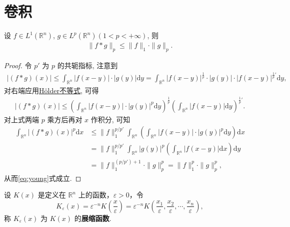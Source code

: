 \documentclass[../../main.tex]{subfiles}%
\begin{document}
\section{卷积}

\begin{theorem}[Young不等式]\label{theorem:实变函数--Young不等式}
设 $f\in L^1(\mathbb{R}^n)$, $g\in L^p(\mathbb{R}^n)(1<p<+\infty)$, 则
\begin{align}
\|f*g\|_p \leqslant \|f\|_1 \cdot \|g\|_p.
\label{eq:young}
\end{align}
\end{theorem}
\begin{proof}
令 $p'$ 为 $p$ 的共轭指标, 注意到
\begin{align*}
|(f*g)(x)| \leqslant \int_{\mathbb{R}^n} |f(x-y)| \cdot |g(y)| \mathrm{d}y 
= \int_{\mathbb{R}^n} |f(x-y)|^{\frac{1}{p}} \cdot |g(y)| \cdot |f(x-y)|^{\frac{1}{p}'} \mathrm{d}y,
\end{align*}
对右端应用\hyperref[theorem:实变函数--Hölder不等式]{Hölder不等式}, 可得
\begin{align*}
|(f*g)(x)| \leqslant \left( \int_{\mathbb{R}^n} |f(x-y)| \cdot |g(y)|^p \mathrm{d}y \right)^{\frac{1}{p}} \left( \int_{\mathbb{R}^n} |f(x-y)| \mathrm{d}y \right)^{\frac{1}{p}'}.
\end{align*}
对上式两端 $p$ 乘方后再对 $x$ 作积分, 可知
\begin{align*}
\int_{\mathbb{R}^n} |(f*g)(x)|^p \mathrm{d}x
&\leqslant \|f\|_1^{p/p'} \int_{\mathbb{R}^n} \left( \int_{\mathbb{R}^n} |f(x-y)| \cdot |g(y)|^p \mathrm{d}y \right) \mathrm{d}x \\
&= \|f\|_1^{p/p'} \int_{\mathbb{R}^n} |g(y)|^p \left( \int_{\mathbb{R}^n} |f(x-y)| \mathrm{d}x \right) \mathrm{d}y \\
&= \|f\|_1^{(p/p')+1} \cdot \|g\|_p^p = \|f\|_1^p \cdot \|g\|_p^p,
\end{align*}
从而\eqref{eq:young}式成立.
\end{proof}

\begin{definition}[展缩函数]\label{definition:展缩函数}
设 \( K(x) \) 是定义在 \( \mathbb{R}^n \) 上的函数，\( \varepsilon > 0 \)，令
\[
K_{\varepsilon}(x) = \varepsilon^{-n} K\left( \frac{x}{\varepsilon} \right) = \varepsilon^{-n} K\left( \frac{x_1}{\varepsilon}, \frac{x_2}{\varepsilon}, \cdots, \frac{x_n}{\varepsilon} \right),
\]
称 \( K_{\varepsilon}(x) \) 为 \( K(x) \) 的\textbf{展缩函数}.
\end{definition}
\end{document}
